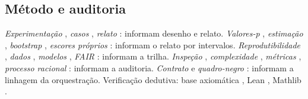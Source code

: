\subsection{Método e auditoria}
\textit{Experimentação} \cite{basili1986,wohlin2012}, \textit{casos} \cite{runeson2009}, \textit{relato} \cite{page2021}: informam desenho e relato. \textit{Valores-p} \cite{wasserstein2016}, \textit{estimação} \cite{cumming2014}, \textit{bootstrap} \cite{efron1979}, \textit{escores próprios} \cite{gneiting2007}: informam o relato por intervalos. \textit{Reprodutibilidade} \cite{osc2015,collberg2016,ioannidis2005}, \textit{dados} \cite{gebru2021}, \textit{modelos} \cite{mitchell2019}, \textit{FAIR} \cite{wilkinson2016}: informam a trilha. \textit{Inspeção} \cite{fagan1976}, \textit{complexidade} \cite{mccabe1976}, \textit{métricas} \cite{chidamber1994}, \textit{processo racional} \cite{parnas1986}: informam a auditoria. \textit{Contrato} \cite{smith1980} e \textit{quadro-negro} \cite{erman1980}: informam a linhagem da orquestração. Verificação dedutiva: base axiomática \cite{hoare1969}, Lean \cite{moura2021}, Mathlib \cite{mathlib2020}.
